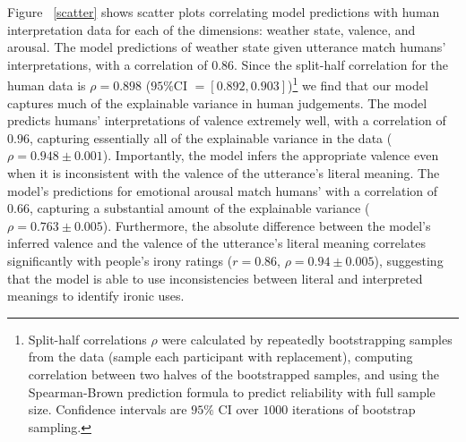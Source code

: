 \documentclass[10pt,letterpaper]{article}
\begin{document}
Figure ~\ref{scatter} shows scatter plots correlating model predictions with human interpretation data for each of the dimensions: weather state, valence, and arousal. %
The model predictions of weather state given utterance match humans' interpretations, with a correlation of $0.86$. Since the split-half correlation for the human data is $\rho=0.898$ ($95\%$CI $= [0.892, 0.903]$)\footnote{Split-half correlations $\rho$ were calculated by repeatedly bootstrapping samples from the data (sample each participant with replacement), computing correlation between two halves of the bootstrapped samples, and using the Spearman-Brown prediction formula to predict reliability with full sample size. Confidence intervals are $95\%$ CI over $1000$ iterations of bootstrap sampling.\label{splithalf}}  we find that our model captures much of the explainable variance in human judgements. The model predicts humans' interpretations of valence extremely well, with a correlation of $0.96$, capturing essentially all of the explainable variance in the data ($\rho = 0.948\pm0.001$).
Importantly, the model infers the appropriate valence even when it is inconsistent with the valence of the utterance's literal meaning. 
The model's predictions for emotional arousal match humans' with a correlation of $0.66$, capturing a substantial amount of the explainable variance ($\rho = 0.763\pm0.005$). Furthermore, the absolute difference between the model's inferred valence and the valence of the utterance's literal meaning correlates significantly with people's irony ratings ($r = 0.86$, $\rho=0.94 \pm 0.005$), suggesting that the model is able to use inconsistencies between literal and interpreted meanings to identify ironic uses.
\end{document}
